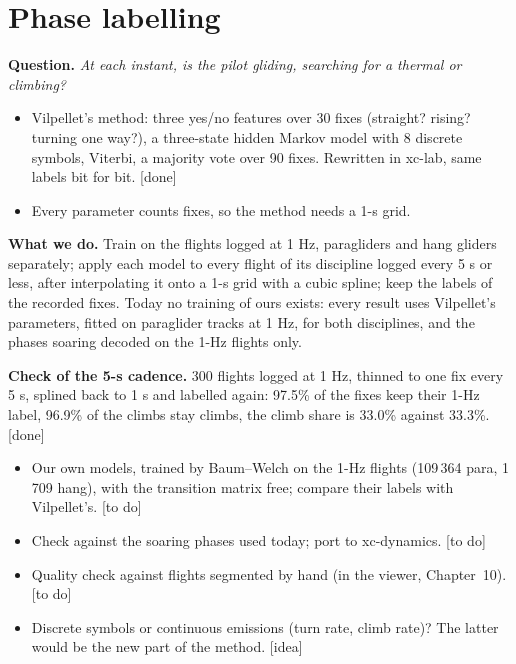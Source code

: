 \documentclass[11pt]{article}
\newcommand{\done}{\textcolor{green!45!black}{\textsf{[done]}}}
\newcommand{\todo}{\textcolor{orange!85!black}{\textsf{[to do]}}}
\newcommand{\idea}{\textcolor{blue!70!black}{\textsf{[idea]}}}
\newcommand{\Q}[1]{\noindent\textbf{Question.} \emph{#1}\par\smallskip}
\begin{document}
\section{Phase labelling}

\Q{At each instant, is the pilot gliding, searching for a thermal or climbing?}
\begin{itemize}
  \item Vilpellet's method: three yes/no features over 30 fixes (straight? rising? turning one
        way?), a three-state hidden Markov model with 8 discrete symbols, Viterbi, a majority vote
        over 90 fixes. Rewritten in xc-lab, same labels bit for bit. \done
  \item Every parameter counts fixes, so the method needs a 1-s grid.
\end{itemize}

\begin{aside}
\textbf{What we do.} Train on the flights logged at 1 Hz, paragliders and hang gliders
separately; apply each model to every flight of its discipline logged every 5 s or less, after
interpolating it onto a 1-s grid with a cubic spline; keep the labels of the recorded fixes.
Today no training of ours exists: every result uses Vilpellet's parameters, fitted on paraglider
tracks at 1 Hz, for both disciplines, and the phases soaring decoded on the 1-Hz flights only.

\smallskip\textbf{Check of the 5-s cadence.} 300 flights logged at 1 Hz, thinned to one fix every
5 s, splined back to 1 s and labelled again: 97.5\% of the fixes keep their 1-Hz label, 96.9\% of
the climbs stay climbs, the climb share is 33.0\% against 33.3\%. \done
\end{aside}

\begin{itemize}
  \item Our own models, trained by Baum--Welch on the 1-Hz flights (109\,364 para, 1\,709 hang), with
        the transition matrix free; compare their labels with Vilpellet's. \todo
  \item Check against the soaring phases used today; port to xc-dynamics. \todo
  \item Quality check against flights segmented by hand (in the viewer, Chapter~10). \todo
  \item Discrete symbols or continuous emissions (turn rate, climb rate)? The latter would be the
        new part of the method. \idea
\end{itemize}
\end{document}
